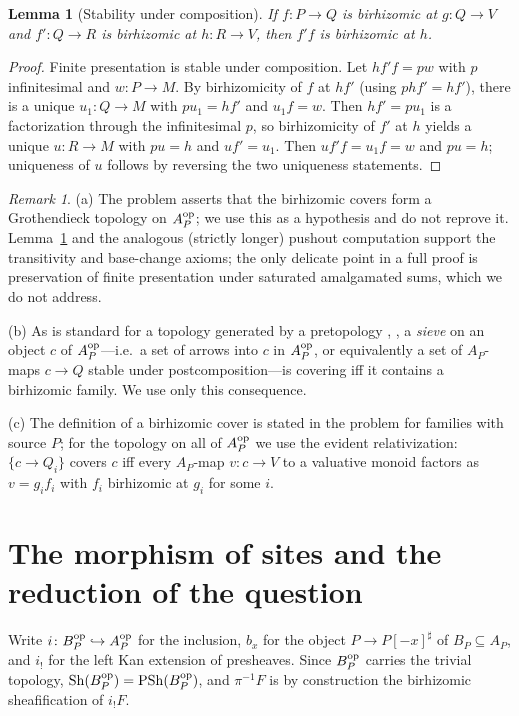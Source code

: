 \documentclass[11pt]{amsart}
\theoremstyle{plain}
\newtheorem{lemma}[theorem]{Lemma}
\theoremstyle{remark}
\newtheorem{remark}[theorem]{Remark}
\theoremstyle{definition}
\numberwithin{equation}{section}
\begin{document}
\begin{lemma}[Stability under composition]\label{lem:composition}
If $f\colon P\to Q$ is birhizomic at $g\colon Q\to V$ and
$f'\colon Q\to R$ is birhizomic at $h\colon R\to V$, then $f'f$ is
birhizomic at $h$.
\end{lemma}
\begin{proof}
Finite presentation is stable under composition.  Let
$hf'f=pw$ with $p$ infinitesimal and $w\colon P\to M$.  By birhizomicity
of $f$ at $hf'$ (using $phf'=hf'$), there is a unique
$u_1\colon Q\to M$ with $pu_1=hf'$ and $u_1f=w$.  Then $hf'=pu_1$ is a
factorization through the infinitesimal $p$, so birhizomicity of $f'$ at
$h$ yields a unique $u\colon R\to M$ with $pu=h$ and $uf'=u_1$.  Then
$uf'f=u_1f=w$ and $pu=h$; uniqueness of $u$ follows by reversing the two
uniqueness statements.
\end{proof}

\begin{remark}
(a) The problem asserts that the birhizomic covers form a Grothendieck
topology on $A_P^{\rm op}$; we use this as a hypothesis and do not reprove
it.  Lemma~\ref{lem:composition} and the analogous (strictly longer)
pushout computation support the transitivity and base-change axioms; the
only delicate point in a full proof is preservation of finite
presentation under saturated amalgamated sums, which we do not address.

(b) As is standard for a topology generated by a pretopology
\cite[Ch.~III]{SGA4}, \cite{MM}, a \emph{sieve} on an object $c$ of
$A_P^{\rm op}$---i.e.\ a set of arrows into $c$ in $A_P^{\rm op}$, or
equivalently a set of $A_P$-maps $c\to Q$ stable under
postcomposition---is covering iff it contains a birhizomic family.  We
use only this consequence.

(c) The definition of a birhizomic cover is stated in the problem for
families with source $P$; for the topology on all of $A_P^{\rm op}$ we
use the evident relativization: $\{c\to Q_i\}$ covers $c$ iff every
$A_P$-map $v\colon c\to V$ to a valuative monoid factors as
$v=g_if_i$ with $f_i$ birhizomic at $g_i$ for some $i$.
\end{remark}

\section{The morphism of sites and the reduction of the question}

Write $i\colon B_P^{\rm op}\hookrightarrow A_P^{\rm op}$ for the inclusion,
$b_x$ for the object $P\to P[-x]^\sharp$ of $B_P\subseteq A_P$, and
$i_!$ for the left Kan extension of presheaves.  Since $B_P^{\rm op}$ carries
the trivial topology, $\operatorname{Sh}(B_P^{\rm op})=\operatorname{PSh}(B_P^{\rm op})$,
and $\pi^{-1}F$ is by construction the birhizomic sheafification of
$i_!F$.
\end{document}
